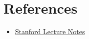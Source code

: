 \documentclass{article}
\theoremstyle{definition}
\theoremstyle{remark}
\begin{document}
\section{References}
\begin{itemize}
    \item \href{https://see.stanford.edu/materials/lsocoee364b/01-subgradients_notes.pdf}{Stanford Lecture Notes}
\end{itemize}













\end{document}
